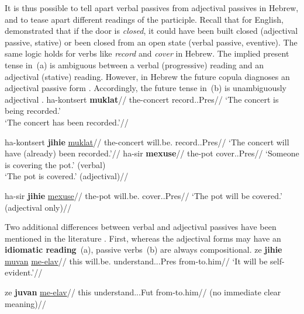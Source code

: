 It is thus possible to tell apart verbal passives from adjectival passives in Hebrew, and to tease apart different readings of the participle. Recall that for English, \cite{embick04li} demonstrated that if the door is \emph{closed}, it could have been built closed (adjectival passive, stative) or been closed from an open state (verbal passive, eventive). The same logic holds for verbs like \emph{record} and \emph{cover} in Hebrew. The implied present tense in~(\nextx a) is ambiguous between a verbal (progressive) reading and an adjectival (stative) reading. However, in Hebrew the future copula diagnoses an adjectival passive form \citep{doron00}. Accordingly, the future tense in~(\nextx b) is unambiguously adjectival \citep{doron00,horvathsiloni08,meltzerasscher11}.
\pex \label{ex:pres-ambig}
    \a \begingl
        \gla ha-kontsert \textbf{muklat}//
        \glb the-concert record..Pres//
        \glft `The concert is being recorded.'\\`The concert has been recorded.'//
    \endgl
        
    \a \begingl
        \gla ha-kontsert \textbf{jihie} \underline{muklat}//
        \glb the-concert will.be. record..Pres//
        \glft `The concert will have (already) been recorded.'//
    \endgl
\xe
\pex \label{ex:pres-ambig2}
    \a \begingl
        \gla ha-sir \textbf{mexuse}//
        \glb the-pot cover..Pres//
        \glft `Someone is covering the pot.' (verbal)\\`The pot is covered.' (adjectival)//
    \endgl
        
    \a \begingl
        \gla ha-sir \textbf{jihie} \underline{mexuse}//
        \glb the-pot will.be. cover..Pres//
        \glft `The pot will be covered.' (adjectival only)//
    \endgl
\xe

Two additional differences between verbal and adjectival passives have been mentioned in the literature \citep{horvathsiloni08,horvathsiloni09,meltzerasscher11,kastnerzu17}. First, whereas the adjectival forms may have an \textbf{idiomatic reading}~(\nextx a), passive verbs~(\nextx b) are always compositional.
\pex \label{ex:idiom}
    \a 
        \begingl
        \gla ze \textbf{jihie} \underline{muvan} \underline{me-elav}//
        \glb this will.be. understand...Pres from-to.him//
        \glft `It will be self-evident.'//
        \endgl

    \a \ljudge{\#}
        \begingl
        \gla ze \textbf{juvan} \underline{me-elav}//
        \glb this understand...Fut from-to.him//
        \glft (no immediate clear meaning)//
        \endgl
\xe

